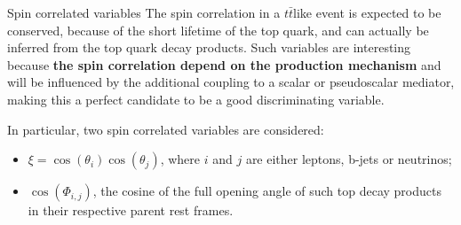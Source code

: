\documentclass[8pt]{beamer}
\begin{document}
\begin{frame}{Spin correlated variables}
\justifying
The spin correlation in a $t \bar t$like event is expected to be conserved, because of the short lifetime of the top quark, and can actually be inferred from the top quark decay products. \vfill
Such variables are interesting because \textbf{the spin correlation depend on the production mechanism} and will be influenced by
the additional coupling to a scalar or pseudoscalar mediator, making this a perfect candidate to be a good discriminating variable. \vfill

In particular, two spin correlated variables are considered:
\begin{itemize}
\justifying
\item $\xi = \cos(\theta_i) \cos(\theta_j)$, where $i$ and $j$ are either leptons, b-jets or neutrinos;
\item $\cos(\Phi_{i,j})$, the cosine of the full opening angle of such top decay products in their respective parent rest frames.
\end{itemize}
\end{frame}
\end{document}
